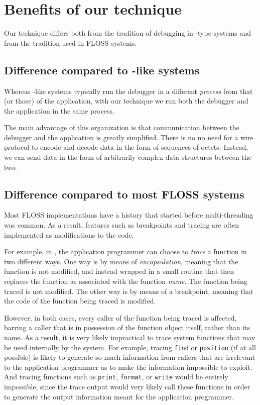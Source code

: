 \section{Benefits of our technique}
\label{sec-benefits}

Our technique differs both from the tradition of debugging in
\unix{}-type systems and from the tradition used in FLOSS
\commonlisp{} systems.

\subsection{Difference compared to \unix{}-like systems}

Whereas \unix{}-like systems typically run the debugger in a different
\emph{process} from that (or those) of the application, with our
technique we run both the debugger and the application in the same
process.

The main advantage of this organization is that communication between
the debugger and the application is greatly simplified.  There is no
no need for a wire protocol to encode and decode data in the form of
sequences of octets.  Instead, we can send data in the form of
arbitrarily complex data structures between the two.  

\subsection{Difference compared to most FLOSS \commonlisp{} systems}

Most FLOSS \commonlisp{} implementations have a history that started
before multi-threading was common.  As a result, features such as
breakpoints and tracing are often implemented as modifications to
the code.

For example, in \sbcl{}, the application programmer can choose to
\emph{trace} a function in two different ways.  One way is by means of
\emph{encapsulation}, meaning that the function is not modified, and
instead wrapped in a small routine that then replaces the function as
associated with the function \emph{name}.  The function being traced
is not modified.  The other way is by means of a breakpoint, meaning
that the code of the function being traced is modified.

However, in both cases, every caller of the function being traced is
affected, barring a caller that is in possession of the function
object itself, rather than its name.  As a result, it is very likely
impractical to trace system functions that may be used internally by
the system.  For example, tracing \texttt{find} or \texttt{position}
(if at all possible) is likely to generate so much information from
callers that are irrelevant to the application programmer as to make
the information impossible to exploit.  And tracing functions such as
\texttt{print}, \texttt{format}, or \texttt{write} would be entirely
impossible, since the trace output would very likely call these
functions in order to generate the output information meant for the
application programmer.

